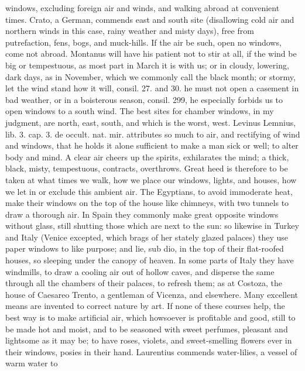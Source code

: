{windows, excluding foreign air and winds, and walking abroad at
convenient times. Crato, a German, commends east and south site
(disallowing cold air and northern winds in this case, rainy weather
and misty days), free from putrefaction, fens, bogs, and muck-hills. If
the air be such, open no windows, come not abroad. Montanus will have
his patient not to stir at all, if the wind be big or
tempestuous, as most part in March it is with us; or in cloudy,
lowering, dark days, as in November, which we commonly call the black
month; or stormy, let the wind stand how it will, consil. 27. and 30.
he must not open a casement in bad weather, or in a boisterous
season, consil. 299, he especially forbids us to open windows to a
south wind. The best sites for chamber windows, in my judgment, are
north, east, south, and which is the worst, west. Levinus Lemnius, lib.
3. cap. 3. de occult. nat. mir. attributes so much to air, and
rectifying of wind and windows, that he holds it alone sufficient to
make a man sick or well; to alter body and mind. A clear air
cheers up the spirits, exhilarates the mind; a thick, black, misty,
tempestuous, contracts, overthrows. Great heed is therefore to be taken
at what times we walk, how we place our windows, lights, and houses,
how we let in or exclude this ambient air. The Egyptians, to avoid
immoderate heat, make their windows on the top of the house like
chimneys, with two tunnels to draw a thorough air. In Spain they
commonly make great opposite windows without glass, still shutting
those which are next to the sun: so likewise in Turkey and Italy
(Venice excepted, which brags of her stately glazed palaces) they use
paper windows to like purpose; and lie, sub dio, in the top of their
flat-roofed houses, so sleeping under the canopy of heaven. In some
parts of Italy they have windmills, to draw a cooling air out of
hollow caves, and disperse the same through all the chambers of their
palaces, to refresh them; as at Costoza, the house of Caesareo Trento,
a gentleman of Vicenza, and elsewhere. Many excellent means are
invented to correct nature by art. If none of these courses help, the
best way is to make artificial air, which howsoever is profitable and
good, still to be made hot and moist, and to be seasoned with sweet
perfumes, pleasant and lightsome as it may be; to have roses,
violets, and sweet-smelling flowers ever in their windows, posies in
their hand. Laurentius commends water-lilies, a vessel of warm water to
}
